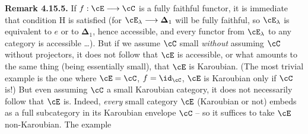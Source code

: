 \textbf{Remark 4.15.5.} If $f : \cE \longrightarrow \cC$ is a fully faithful functor, it is immediate that condition H is satisfied (for $\cE_{\lambda} \longrightarrow \mathbf{\Delta}_1$ will be fully faithful, so $\cE_{\lambda}$ is equivalent
to $e$ or to $\mathbf{\Delta}_1$, hence accessible, and every functor from $\cE_{\lambda}$ to any category is %
accessible \dots). But if we assume $\cC$ small \textit{without} assuming $\cC$ without projectors, it does not follow that $\cE$ is accessible, or what amounts to the same thing (being essentially small), that $\cE$ is Karoubian. (The most trivial example is the one where $\cE = \cC$, $f = \id_{\cC}$, $\cE$ is Karoubian only if $\cC$ is!) But even assuming $\cC$ a small Karoubian category, it does not necessarily follow that $\cE$ is. Indeed, \textit{every} small category $\cE$ (Karoubian or not) embeds as a full subcategory in its Karoubian envelope $\cC$ -- so it suffices to take $\cE$ non-Karoubian. The example

